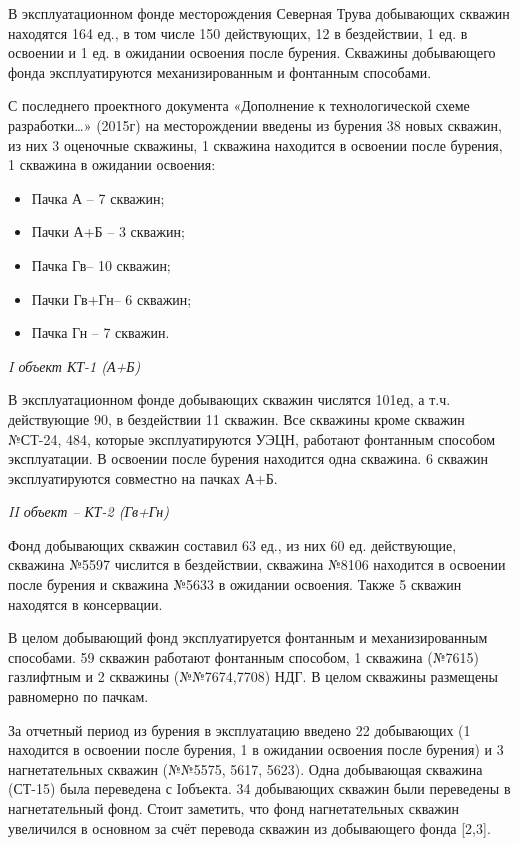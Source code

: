 \begin{multicols}{2}
В эксплуатационном фонде месторождения Северная Трува добывающих скважин
находятся 164 ед., в том числе 150 действующих, 12 в бездействии, 1 ед.
в освоении и 1 ед. в ожидании освоения после бурения. Скважины
добывающего фонда эксплуатируются механизированным и фонтанным
способами.

С последнего проектного документа «Дополнение к технологической схеме
разработки\ldots» (2015г) на месторождении введены из бурения 38 новых
скважин, из них 3 оценочные скважины, 1 скважина находится в освоении
после бурения, 1 скважина в ожидании освоения:

\begin{itemize}
\item
  Пачка А -- 7 скважин;
\item
  Пачки А+Б -- 3 скважин;
\item
  Пачка Гв-- 10 скважин;
\item
  Пачки Гв+Гн-- 6 скважин;
\item
  Пачка Гн -- 7 скважин.
\end{itemize}

\emph{I объект КТ-1 (А+Б)}

В эксплуатационном фонде добывающих скважин числятся 101ед, а т.ч.
действующие 90, в бездействии 11 скважин. Все скважины кроме скважин
№СТ-24, 484, которые эксплуатируются УЭЦН, работают фонтанным способом
эксплуатации. В освоении после бурения находится одна скважина. 6
скважин эксплуатируются совместно на пачках А+Б.

\emph{II объект -- КТ-2 (Гв+Гн)}

Фонд добывающих скважин составил 63 ед., из них 60 ед. действующие,
скважина №5597 числится в бездействии, скважина №8106 находится в
освоении после бурения и скважина №5633 в ожидании освоения. Также 5
скважин находятся в консервации.

В целом добывающий фонд эксплуатируется фонтанным и механизированным
способами. 59 скважин работают фонтанным способом, 1 скважина (№7615)
газлифтным и 2 скважины (№№7674,7708) НДГ. В целом скважины размещены
равномерно по пачкам.

За отчетный период из бурения в эксплуатацию введено 22 добывающих (1
находится в освоении после бурения, 1 в ожидании освоения после бурения)
и 3 нагнетательных скважин (№№5575, 5617, 5623). Одна добывающая
скважина (СТ-15) была переведена с Iобъекта. 34 добывающих скважин были
переведены в нагнетательный фонд. Стоит заметить, что фонд
нагнетательных скважин увеличился в основном за счёт перевода скважин из
добывающего фонда {[}2,3{]}.


\end{multicols}

